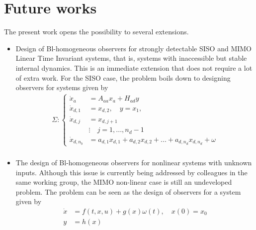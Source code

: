 \documentclass[11pt,letterpaper,twoside,openright]{report}
\begin{document}
\section{Future works}
The present work opens the possibility to several extensions.
\begin{itemize}
	\item Design of Bl-homogeneous observers for strongly detectable SISO and MIMO Linear Time Invariant systems, that is, systems with inaccessible but stable internal dynamics. This is an immediate extension that does not require a lot of extra work. For the SISO case, the problem boils down to designing observers for systems given by
	\begin{equation}
		\begin{split}\label{ecu: SISO SCB sys}
			\Sigma: \left\{
			\begin{array}{rl}
				\dot{x}_a &= A_{aa}x_a + H_{ad}y\\
				\dot{x}_{d,1} &= x_{d,2}, \quad y=x_{1}, \\
				\dot{x}_{d,j} &= x_{d,j+1} \\
				& \vdots \quad j=1,...,n_{d}-1\\
				\dot{x}_{d,n_{b}} &= a_{d,1}x_{d,1} + a_{d,2}x_{d,2} +...+ a_{d,n_d}x_{d,n_d} + \omega
			\end{array}
			\right. \\
		\end{split}
	\end{equation}
	
	\item The design of Bl-homogeneous observers for nonlinear systems with unknown inputs. Although this issue is currently being addressed by colleagues in the same working group, the MIMO non-linear case is still an undeveloped problem. The problem can be seen as the design of observers for a system given by
	\begin{equation}
		\begin{split}
			\dot{x} &= f(t,x,u)+g(x)\omega(t), \quad x(0)=x_0 \\
			y &= h(x)
		\end{split}
	\end{equation}
	

\end{itemize}
\end{document}
